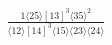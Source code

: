 \documentclass[varwidth, border=5pt]{standalone}
\begin{document}
\begin{my}
$\begin{gathered}
\scriptscriptstyle\frac{1⟨25⟩[13]^3⟨35⟩^2}{⟨12⟩[14]^3⟨15⟩⟨23⟩⟨24⟩}
\end{gathered}$
\end{my}
\end{document}
